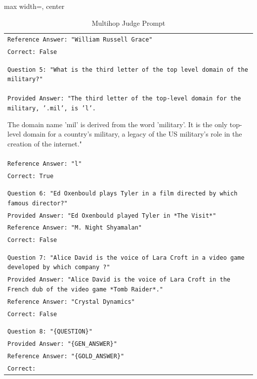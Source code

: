\documentclass[11pt]{article}
\begin{document}
\begin{table}[ht]
\begin{adjustbox}{max width=\textwidth, center}
\begin{tabular}{>{\raggedright\arraybackslash\tt}p{}<{}}
Reference Answer: "William Russell Grace"\\
Correct: False\\
\\
\\
Question 5: "What is the third letter of the top level domain of the military?"\\
Provided Answer: "The third letter of the top-level domain for the military, '.mil', is 'l'. 

The domain name 'mil' is derived from the word 'military'. It is the only top-level domain for a country's military, a legacy of the US military's role in the creation of the internet."\\
Reference Answer: "l"\\
Correct: True\\
\\
\\
Question 6: "Ed Oxenbould plays Tyler in a film directed by which famous director?"\\
Provided Answer: "Ed Oxenbould played Tyler in *The Visit*"\\
Reference Answer: "M. Night Shyamalan"\\
Correct: False\\
\\
\\
Question 7: "Alice David is the voice of Lara Croft in a video game developed by which company ?"\\
Provided Answer: "Alice David is the voice of Lara Croft in the French dub of the video game *Tomb Raider*."\\
Reference Answer: "Crystal Dynamics"\\
Correct: False\\
\\
\\
Question 8: "\{QUESTION\}"\\
Provided Answer: "\{GEN\_ANSWER\}"\\
Reference Answer: "\{GOLD\_ANSWER\}"\\
Correct:\\
        \bottomrule
    \end{tabular}
\end{adjustbox}
    \caption{Multihop Judge Prompt}
    \label{tab:multihop_judge_prompt}
\end{table}
\end{document}
